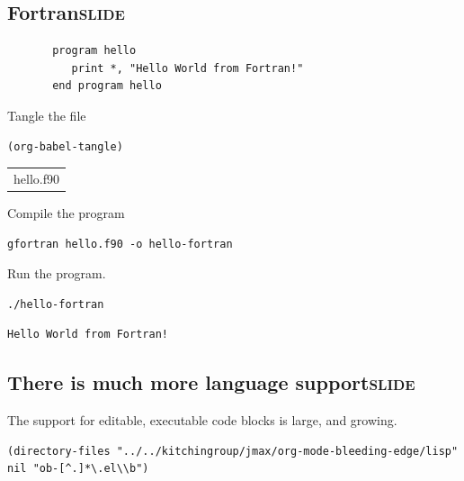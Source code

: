 \documentclass[11pt]{article}
\begin{document}
\subsection{Fortran\hfill{}\textsc{slide}}
\label{sec-11-8}
\begin{verbatim}
       program hello
          print *, "Hello World from Fortran!"
       end program hello
\end{verbatim}

Tangle the file

\begin{verbatim}
(org-babel-tangle)
\end{verbatim}

\begin{center}
\begin{tabular}{l}
hello.f90\\
\end{tabular}
\end{center}

Compile the program
\begin{verbatim}
gfortran hello.f90 -o hello-fortran
\end{verbatim}

Run the program.
\begin{verbatim}
./hello-fortran
\end{verbatim}

\begin{verbatim}
Hello World from Fortran!
\end{verbatim}



\subsection{There is much more language support\hfill{}\textsc{slide}}
\label{sec-11-9}

The support for editable, executable code blocks is large, and growing.

\begin{verbatim}
(directory-files "../../kitchingroup/jmax/org-mode-bleeding-edge/lisp" nil "ob-[^.]*\.el\\b")
\end{verbatim}
\end{document}
